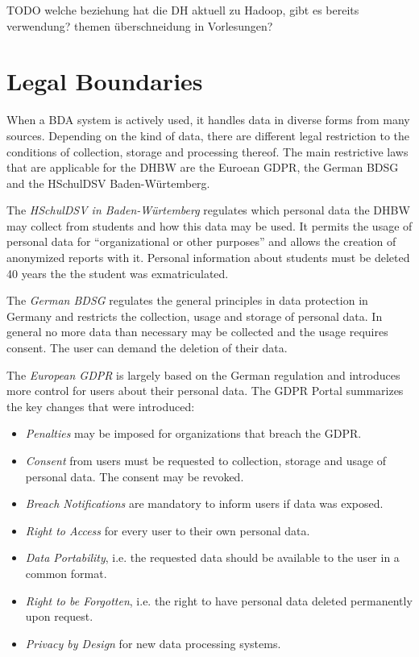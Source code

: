 TODO welche beziehung hat die DH aktuell zu Hadoop, gibt es bereits verwendung? themen überschneidung in Vorlesungen?

\section{Legal Boundaries}

When a \ac{BDA} system is actively used, it handles data in diverse forms from many sources.
Depending on the kind of data, there are different legal restriction 
to the conditions of collection, storage and processing thereof.
The main restrictive laws that are applicable for the \ac{DHBW} are the Euroean \ac{GDPR}, the German \ac{BDSG} and the \ac{HSchulDSV} Baden-Würtemberg.

The \emph{\ac{HSchulDSV} in Baden-Würtemberg}  regulates which personal data the \ac{DHBW} may collect from students and how this data may be used.
It permits the usage of personal data for \enquote{organizational or other purposes} and allows the creation of anonymized reports with it.
Personal information about students must be deleted 40 years the the student was exmatriculated. 
\autocite[][§1, §11, §12]{bw2012hcchuldsv}

The \emph{German \ac{BDSG}} regulates the general principles in data protection in Germany 
and restricts the collection, usage and storage of personal data.
In general no more data than necessary may be collected and the usage requires consent. 
The user can demand the deletion of their data.
\autocite[][§1ff., §12ff.]{bmjv2009bdsg}

The \emph{European \ac{GDPR}} is largely based
on the German regulation and introduces more control for users about their personal data.
\autocite{eu2016gdpr}
The \ac{GDPR} Portal \autocite{trunomi2018gdpr} summarizes the key changes that were introduced:
\begin{itemize}
    \item \emph{Penalties} may be imposed for organizations that breach the \ac{GDPR}.
    \item \emph{Consent} from users must be requested to collection, storage and usage of personal data. The consent may be revoked.
    \item \emph{Breach Notifications} are mandatory to inform users if data was exposed.
    \item \emph{Right to Access} for every user to their own personal data.
    \item \emph{Data Portability}, i.e. the requested data should be available to the user in a common format.
    \item \emph{Right to be Forgotten}, i.e. the right to have personal data deleted permanently upon request.
    \item \emph{Privacy by Design} for new data processing systems.
\end{itemize}

